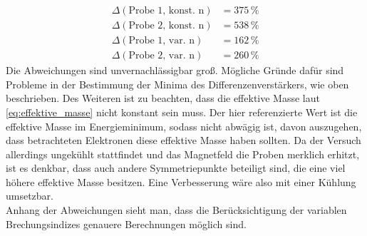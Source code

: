 \begin{align*}
    \Delta(\text{Probe 1, konst. n}) &= 375 \, \% \\
    \Delta(\text{Probe 2, konst. n}) &= 538 \, \% \\
    \Delta(\text{Probe 1, var. n})   &= 162 \, \% \\
    \Delta(\text{Probe 2, var. n})   &= 260 \, \% 
\end{align*}
Die Abweichungen sind unvernachlässigbar groß. Mögliche Gründe dafür sind Probleme in der Bestimmung der Minima des Differenzenverstärkers, wie oben beschrieben.
Des Weiteren ist zu beachten, dass die effektive Masse laut \autoref{eq:effektive_masse} nicht konstant sein muss. Der hier referenzierte Wert
ist die effektive Masse im Energieminimum, sodass nicht abwägig ist, davon auszugehen, dass betrachteten Elektronen diese effektive Masse haben sollten. Da der Versuch allerdings ungekühlt stattfindet und das Magnetfeld
die Proben merklich erhitzt, ist es denkbar, dass auch andere Symmetriepunkte beteiligt sind, die eine viel höhere effektive Masse besitzen. Eine Verbesserung wäre also mit einer Kühlung umsetzbar.\\
Anhang der Abweichungen sieht man, dass die Berücksichtigung der variablen Brechungsindizes genauere Berechnungen möglich sind.

